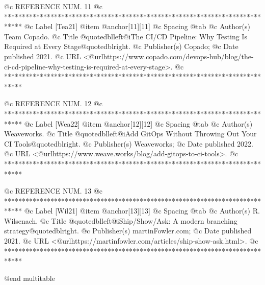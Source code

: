 @c REFERENCE NUM. 11
@c *****************************************************************************
@c Label [Tea21]
@item @anchor{[11]}[11]
@c Spacing
@tab
@c Author(s)
Team Copado.
@c Title
@quotedblleft{}@i{The CI/CD Pipeline: Why Testing Is Required at Every Stage}@quotedblright{}.
@c Publisher(s)
Copado;
@c Date published
2021.
@c URL
<@url{https://www.copado.com/devops-hub/blog/the-ci-cd-pipeline-why-testing-is-required-at-every-stage}>.
@c *****************************************************************************

@c REFERENCE NUM. 12
@c *****************************************************************************
@c Label [Wea22]
@item @anchor{[12]}[12]
@c Spacing
@tab
@c Author(s)
Weaveworks.
@c Title
@quotedblleft{}@i{Add GitOps Without Throwing Out Your CI Tools}@quotedblright{}.
@c Publisher(s)
Weaveworks;
@c Date published
2022.
@c URL
<@url{https://www.weave.works/blog/add-gitops-to-ci-tools}>.
@c *****************************************************************************

@c REFERENCE NUM. 13
@c *****************************************************************************
@c Label [Wil21]
@item @anchor{[13]}[13]
@c Spacing
@tab
@c Author(s)
R. Wilsenach.
@c Title
@quotedblleft{}@i{Ship/Show/Ask: A modern branching strategy}@quotedblright{}.
@c Publisher(s)
martinFowler.com;
@c Date published
2021.
@c URL
<@url{https://martinfowler.com/articles/ship-show-ask.html}>.
@c *****************************************************************************


@end multitable
